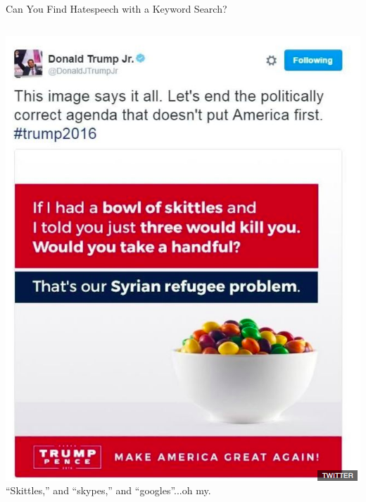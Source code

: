 \documentclass[nobackground,dvipsnames,table]{beamer}
\begin{document}
\begin{frame}{Can You Find Hatespeech with a Keyword Search?}
    \begin{columns}
            \includegraphics[width=\textwidth]{skittles}
             \LARGE
             \centering
             “Skittles,” and “skypes,” and “googles”...oh my.
    \end{columns}
\end{frame}
\end{document}
